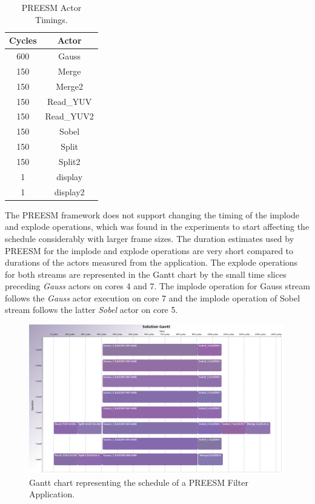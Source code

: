 \begin{table}
    \begin{center}
        \begin{tabular}{| c | c |}

            \hline
            Cycles & Actor \\ \hline
            600 & Gauss \\ \hline
            150 & Merge \\ \hline
            150 & Merge2 \\ \hline
            150 & Read\_YUV \\ \hline
            150 & Read\_YUV2 \\ \hline
            150 & Sobel \\ \hline
            150 & Split \\ \hline
            150 & Split2 \\ \hline
            1 & display \\ \hline
            1 & display2 \\ \hline
        \end{tabular}
        \caption{PREESM Actor Timings.}
        \label{tab:preesm_times}
    \end{center}
\end{table}

The PREESM framework does not support changing the timing of the implode and explode operations, which was found in the experiments to start affecting the schedule considerably with larger frame sizes. The duration estimates used by PREESM for the implode and explode operations are very short compared to durations of the actors measured from the application. The explode operations for both streams are represented in the Gantt chart by the small time slices preceding \textit{Gauss} actors on cores 4 and 7. The implode operation for Gauss stream follows the \textit{Gauss} actor execution on core 7 and the implode operation of Sobel stream follows the latter \textit{Sobel} actor on core 5.

\begin{figure}[h!]
    \begin{center}
        \includegraphics[width=0.99\textwidth]{images/gantt_preesm_cifcif.png}
        \caption{Gantt chart representing the schedule of a PREESM Filter Application.}
        \label{fig:preesm_gantt}
    \end{center}
\end{figure}

